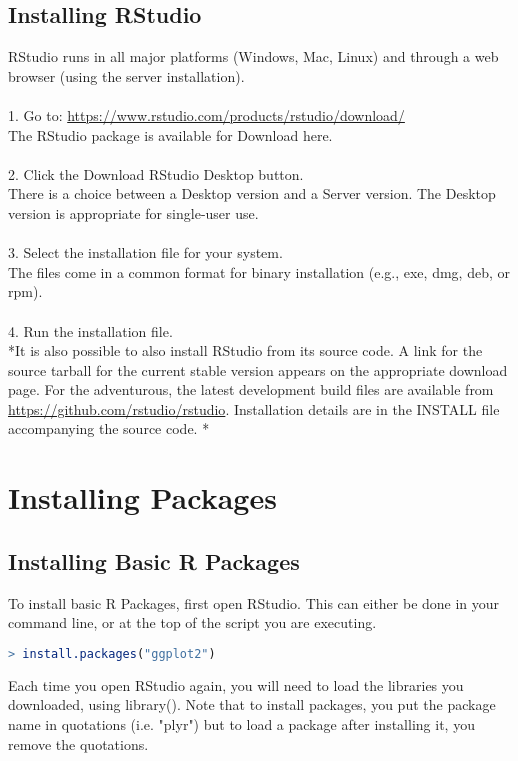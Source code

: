 \documentclass{article}
\begin{document}
\subsection{Installing RStudio}
RStudio runs in all major platforms (Windows, Mac, Linux) and through a web browser (using the server installation). \\  \\
1.	Go to: \url{https://www.rstudio.com/products/rstudio/download/}\\
The RStudio package is available for Download here.\\ \\ 
2.	Click the Download RStudio Desktop button. \\
There is a choice between a Desktop version and a Server version. The Desktop version is appropriate for single-user use.  \\ \\ 
3.	Select the installation file for your system. \\
The files come in a common format for binary installation (e.g., exe, dmg, deb, or rpm). \\ \\
4.	Run the installation file. \\


*It is also possible to also install RStudio from its source code. A link for the source tarball for the current stable version appears on the appropriate download page. For the adventurous, the latest development build files are available from \url{https://github.com/rstudio/rstudio}. Installation details are in the INSTALL file accompanying the source code. *




\section{Installing Packages}
\subsection{Installing Basic R Packages}
To install basic R Packages, first open RStudio. 
This can either be done in your command line, or at the top of the script you are executing. 
\begin{lstlisting}[language=R]
> install.packages("ggplot2")
\end{lstlisting}


Each time you open RStudio again, you will need to load the libraries you downloaded, using library(). Note that to install packages, you put the package name in quotations (i.e. "plyr") but to load a package after installing it, you remove the quotations.
\end{document}
